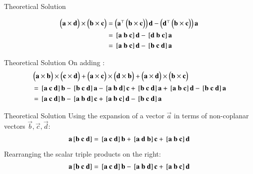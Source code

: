 \documentclass{beamer}
\begin{document}
\begin{frame}{Theoretical Solution}

\begin{align}
\myvec{\vec{a} \times\vec{d}} \times\myvec{\vec{b} \times\vec{c}}&=
\myvec{\vec{a}^\top \myvec{\vec{b} \times \vec{c}}} \vec{d} - \myvec{\vec{d}^\top \myvec{\vec{b} \times \vec{c}}} \vec{a}\\
&=\sbrak{\vec{a} \ \vec{b} \ \vec{c}}\vec{d} - \sbrak{\vec{d} \ \vec{b} \ \vec{c}}\vec{a} \\
&= \sbrak{\vec{a} \ \vec{b} \ \vec{c}}\vec{d} - \sbrak{\vec{b} \ \vec{c} \ \vec{d}}\vec{a}
\end{align}
\end{frame}

\begin{frame}{Theoretical Solution}
On adding :
\begin{align}
& \myvec{\vec{a} \times\vec{b}} \times\myvec{\vec{c} \times\vec{d}} + \myvec{\vec{a} \times\vec{c}} \times\myvec{\vec{d} \times\vec{b}} + \myvec{\vec{a} \times\vec{d}} \times\myvec{\vec{b} \times\vec{c}}\\
&= \sbrak{\vec{a} \ \vec{c} \ \vec{d}}\vec{b}-\sbrak{\vec{b} \ \vec{c} \ \vec{d}}\vec{a}-\sbrak{\vec{a} \ \vec{b} \ \vec{d}}\vec{c}+\sbrak{\vec{b} \ \vec{c} \ \vec{d}}\vec{a}+\sbrak{\vec{a} \ \vec{b} \ \vec{c}}\vec{d}-\sbrak{\vec{b} \ \vec{c} \ \vec{d}}\vec{a}\\
&= \sbrak{\vec{a} \ \vec{c} \ \vec{d}}\vec{b} - \sbrak{\vec{a} \ \vec{b} \ \vec{d}}\vec{c} + \sbrak{\vec{a} \ \vec{b} \ \vec{c}}\vec{d} - \sbrak{\vec{b} \ \vec{c} \ \vec{d}}\vec{a}
\end{align}
\end{frame}

\begin{frame}{Theoretical Solution}
Using the expansion of a vector $\vec{a}$ in terms of non-coplanar vectors $\vec{b}, \vec{c}, \vec{d}$:
\begin{align}
\vec{a}\sbrak{\vec{b} \ \vec{c} \ \vec{d}} = \sbrak{\vec{a} \ \vec{c} \ \vec{d}}\vec{b} + \sbrak{\vec{a} \ \vec{d} \ \vec{b}}\vec{c} + \sbrak{\vec{a} \ \vec{b} \ \vec{c}}\vec{d}
\end{align}
Rearranging the scalar triple products on the right:
\begin{align}
\vec{a}\sbrak{\vec{b} \ \vec{c} \ \vec{d}} = \sbrak{\vec{a} \ \vec{c} \ \vec{d}}\vec{b} - \sbrak{\vec{a} \ \vec{b} \ \vec{d}}\vec{c} + \sbrak{\vec{a} \ \vec{b} \ \vec{c}}\vec{d}
\end{align}
\end{frame}
\end{document}
